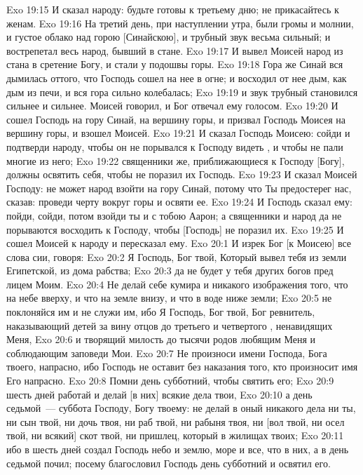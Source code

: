 \vs Exo 19:15 И сказал народу: будьте готовы к третьему дню; не прикасайтесь к женам.
\rsbpar\vs Exo 19:16 На третий день, при наступлении утра, были громы и молнии, и густое облако над горою [Синайскою], и трубный звук весьма сильный; и вострепетал весь народ, бывший в стане.
\vs Exo 19:17 И вывел Моисей народ из стана в сретение Богу, и стали у подошвы горы.
\vs Exo 19:18 Гора же Синай вся дымилась оттого, что Господь сошел на нее в огне; и восходил от нее дым, как дым из печи, и вся гора сильно колебалась;
\vs Exo 19:19 и звук трубный становился сильнее и сильнее. Моисей говорил, и Бог отвечал ему голосом.
\vs Exo 19:20 И сошел Господь на гору Синай, на вершину горы, и призвал Господь Моисея на вершину горы, и взошел Моисей.
\vs Exo 19:21 И сказал Господь Моисею: сойди и подтверди народу, чтобы он не порывался к Господу видеть , и чтобы не пали многие из него;
\vs Exo 19:22 священники же, приближающиеся к Господу [Богу], должны освятить себя, чтобы не поразил их Господь.
\vs Exo 19:23 И сказал Моисей Господу: не может народ взойти на гору Синай, потому что Ты предостерег нас, сказав: проведи черту вокруг горы и освяти ее.
\vs Exo 19:24 И Господь сказал ему: пойди, сойди, потом взойди ты и с тобою Аарон; а священники и народ да не порываются восходить к Господу, чтобы [Господь] не поразил их.
\vs Exo 19:25 И сошел Моисей к народу и пересказал ему.
\vs Exo 20:1 И изрек Бог [к Моисею] все слова сии, говоря:
\rsbpar\vs Exo 20:2 Я Господь, Бог твой, Который вывел тебя из земли Египетской, из дома рабства;
\vs Exo 20:3 да не будет у тебя других богов пред лицем Моим.
\rsbpar\vs Exo 20:4 Не делай себе кумира и никакого изображения того, что на небе вверху, и что на земле внизу, и что в воде ниже земли;
\vs Exo 20:5 не поклоняйся им и не служи им, ибо Я Господь, Бог твой, Бог ревнитель, наказывающий детей за вину отцов до третьего и четвертого , ненавидящих Меня,
\vs Exo 20:6 и творящий милость до тысячи родов любящим Меня и соблюдающим заповеди Мои.
\rsbpar\vs Exo 20:7 Не произноси имени Господа, Бога твоего, напрасно, ибо Господь не оставит без наказания того, кто произносит имя Его напрасно.
\rsbpar\vs Exo 20:8 Помни день субботний, чтобы святить его;
\vs Exo 20:9 шесть дней работай и делай [в них] всякие дела твои,
\vs Exo 20:10 а день седьмой~--- суббота Господу, Богу твоему: не делай в оный никакого дела ни ты, ни сын твой, ни дочь твоя, ни раб твой, ни рабыня твоя, ни [вол твой, ни осел твой, ни всякий] скот твой, ни пришлец, который в жилищах твоих;
\vs Exo 20:11 ибо в шесть дней создал Господь небо и землю, море и все, что в них, а в день седьмой почил; посему благословил Господь день субботний и освятил его.
